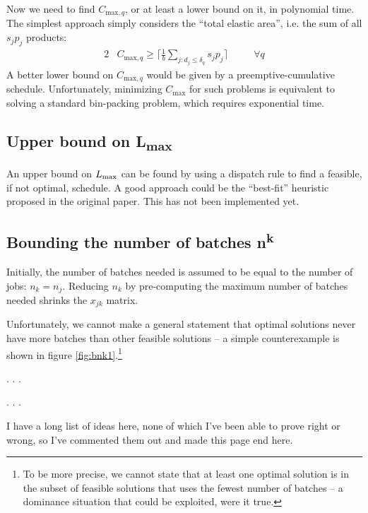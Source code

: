 Now we need to find $C_{\text{max},q}$, or at least a lower bound on it, in
polynomial time. The simplest approach simply considers the ``total elastic area'',
i.e. the sum of all $s_j p_j$ products:
\begin{alignat}{2}
& C_{\text{max},q} \geq \big\lceil\frac{1}{b} \sum_{j : d_j \leq \delta_q} s_j
p_j\big\rceil \quad
&& \forall q
\end{alignat}
A better lower bound on $C_{\text{max},q}$ would be given by a
preemptive-cumulative schedule. Unfortunately, minimizing $C_{\text{max}}$ for
such problems is equivalent to solving a standard bin-packing problem, which
requires exponential time. 

\subsection{Upper bound on {\sansitalicfont L}\textsubscript{max}}
An upper bound on $L_{\text{max}}$ can be found by using a dispatch rule to find a
feasible, if not optimal, schedule. A good approach could be the ``best-fit''
heuristic proposed in the original paper. {\color{darkred} This has not been
implemented yet.}

\subsection{Bounding the number of batches \sansitalicfont n\textsuperscript{k}}
Initially, the number of batches needed is assumed to be equal to the number of jobs: $n_k = n_j$. Reducing $n_k$ by pre-computing the maximum number of batches needed shrinks the $x_{jk}$ matrix.

Unfortunately, we cannot make a general statement that optimal solutions never have more batches than other feasible solutions -- a simple counterexample is shown in figure \ref{fig:bnk1}.\footnote{To be more precise, we cannot state that at least one optimal solution is in the subset of feasible solutions that uses the fewest number of batches -- a dominance situation that could be exploited, were it true.}

. . .

. . .
\vfil


{\color{darkred} I have a long list of ideas here, none of which I've been able
to prove right or wrong, so I've commented them out and made this page end here.}

